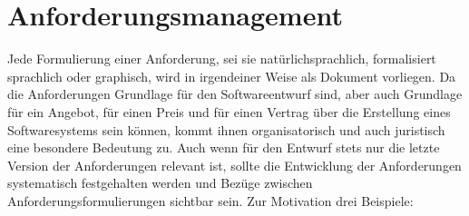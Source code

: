 \section{Anforderungsmanagement}
\label{sec:Kap-6.5}

\vspace{\baselineskip} %

Jede Formulierung einer Anforderung, sei sie natürlichsprachlich, formalisiert sprachlich oder graphisch, wird in irgendeiner Weise als Dokument vorliegen. Da die Anforderungen Grundlage für den Softwareentwurf sind, aber auch Grundlage für ein Angebot, für einen Preis und für einen Vertrag über die Erstellung eines Software\-systems sein können, kommt ihnen organisatorisch und auch juristisch eine besondere Bedeutung zu. Auch wenn für den Entwurf stets nur die letzte Version der Anforderungen relevant ist, sollte die Entwicklung der Anforderungen systematisch festgehalten werden und Bezüge zwischen Anforderungsformulierungen sichtbar sein. Zur Motivation drei Beispiele:

\vspace{1mm} %

